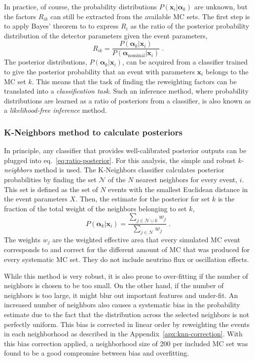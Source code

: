 In practice, of course, the probability distributions $P(\boldsymbol{x}_i|\boldsymbol{\alpha}_k)$ are unknown, but the factors $R_{ik}$  can still be extracted from the available MC sets.
The first step is to apply Bayes' theorem to  to express $R_i$ as the ratio of the posterior probability distribution of the detector parameters given the event parameters,
\begin{equation}
    R_{ik} = \frac{P(\boldsymbol{\alpha}_k|\boldsymbol{x}_i)}{P(\boldsymbol{\alpha}_\mathrm{nominal}|\boldsymbol{x}_i)}\;. \label{eq:ratio-posterior}
\end{equation}
The posterior distributions, $P(\boldsymbol{\alpha}_k|\boldsymbol{x}_i)$, can be acquired from a classifier trained to give the posterior probability that an event with parameters $\boldsymbol{x}_i$ belongs to the MC set $k$.
This means that the task of finding the reweighting factors can be translated into a \emph{classification task}.
Such an inference method, where probability distributions are learned as a ratio of posteriors from a classifier, is also known as a \emph{likelihood-free inference} method.

\subsubsection{K-Neighbors method to calculate posteriors}
In principle, any classifier that provides well-calibrated posterior outputs can be plugged into eq.~\ref{eq:ratio-posterior}.
For this analysis, the simple and robust \emph{k-neighbors} method is used.
The K-Neighbors classifier calculates posterior probabilities by finding the set $\mathcal{N}$ of the $N$ nearest neighbors for every event, $i$.
This set is defined as the set of $N$ events with the smallest Euclidean distance in the event parameters $X$.
  Then, the estimate for the posterior for set $k$ is the fraction of the total weight of the neighbors belonging to set $k$,
\begin{equation}
    P(\boldsymbol{\alpha}_k|\boldsymbol{x}_i) = \frac{\sum_{j\in{\mathcal{N}\cup k}} w_j }{\sum_{j\in{\mathcal{N}}} w_j}\;. \label{eq:posterior-knn}
\end{equation}
The weights $w_j$ are the weighted effective area that every simulated MC event corresponds to and correct for the different amount of MC that was produced for every systematic MC set.
They do not include neutrino flux or oscillation effects.

While this method is very robust, it is also prone to over-fitting if the number of neighbors is chosen to be too small.
On the other hand, if the number of neighbors is too large, it might blur out important features and under-fit.
An increased number of neighbors also causes a systematic bias in the probability estimate due to the fact that the distribution across the selected neighbors is not perfectly uniform.
This bias is corrected in linear order by reweighting the events in each neighborhood as described in the Appendix~\ref{apx:knn-correction}.
With this bias correction applied, a neighborhood size of 200 per included MC set was found to be a good compromise between bias and overfitting.

